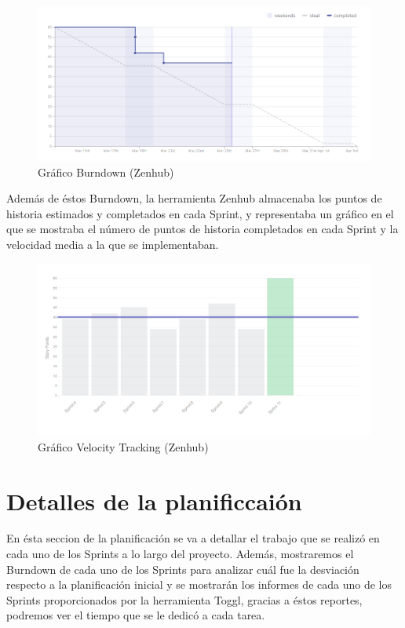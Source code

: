 \documentclass[11pt,openany]{book}
\begin{document}
\begin{figure}[H]
\centering
\includegraphics[totalheight=5cm]{zenhub_burndown.png}
\caption{Gráfico Burndown (Zenhub)}
\end{figure}
\par\bigskip 
\noindent

\pagebreak
Además de éstos Burndown, la herramienta Zenhub almacenaba los puntos de historia estimados y completados en cada Sprint, y representaba un gráfico en el que se mostraba el número de puntos de historia completados en cada Sprint y la velocidad media a la que se implementaban.

\begin{figure}[H]
\centering
\includegraphics[totalheight=5cm]{zenhub_velocity.png}
\caption{Gráfico Velocity Tracking (Zenhub)}
\end{figure}
\par\bigskip 
\noindent

\section{Detalles de la planificcaión}

En ésta seccion de la planificación se va a detallar el trabajo que se realizó en cada uno de los Sprints a lo largo del proyecto. Además, mostraremos el Burndown de cada uno de los Sprints para analizar cuál fue la desviación respecto a la planificación inicial y se mostrarán los informes de cada uno de los Sprints proporcionados por la herramienta Toggl, gracias a éstos reportes, podremos ver el tiempo que se le dedicó a cada tarea.
\end{document}
